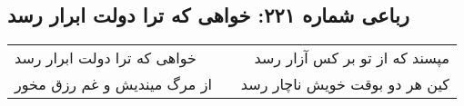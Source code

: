 \begin{center}
\section*{رباعی شماره ۲۲۱: خواهی که ترا دولت ابرار رسد}
\label{sec:sh221}
\begin{longtable}{l p{0.5cm} r}
خواهی که ترا دولت ابرار رسد
&&
مپسند که از تو بر کس آزار رسد
\\
از مرگ میندیش و غم رزق مخور
&&
کین هر دو بوقت خویش ناچار رسد
\\
\end{longtable}
\end{center}
